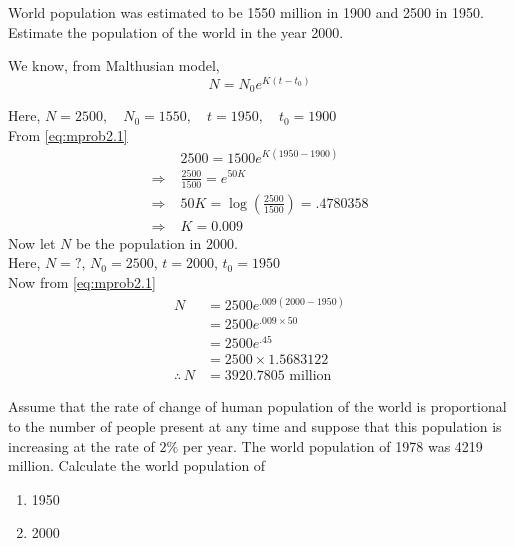 \documentclass[../main-sheet.tex]{subfiles}
\begin{document}
\begin{prob}
    World population was estimated to be 1550 million in 1900 and 2500 in 1950. Estimate the population of the world in the year 2000.
\end{prob}
\begin{soln}
    We know, from Malthusian model,
    \begin{equation}
        N=N_0 e^{K(t-t_0)} \label{eq:mprob2.1}
    \end{equation}
    
    
    Here, \(N=2500,\quad N_0=1550,\quad t=1950,\quad t_0=1900\)\\
    From \eqref{eq:mprob2.1}
    \begin{align*}
        &2500=1500 e^{K(1950-1900)}\\
        \Rightarrow\;&\frac{2500}{1500}= e^{50K}\\
        \Rightarrow\;&50K=\log\left( \frac{2500}{1500} \right)=.4780358\\
        \Rightarrow\;&K=0.009
    \end{align*}
    Now let \(N\) be the population in 2000.\\
    Here, \(N=?\), \(N_0=2500\), \(t=2000\), \(t_0=1950\)\\
    Now from \eqref{eq:mprob2.1}
    \begin{align*}
        N&=2500 e^{.009(2000-1950)}\\
        &=2500 e^{.009\times 50}\\
        &=2500 e^{.45}\\
        &=2500 \times 1.5683122\\
        \therefore\,N&=3920.7805 \text{ million}
    \end{align*}
\end{soln}
\begin{prob}
    Assume that the rate of change of human population of the world is proportional to the number of people present at any time and suppose that this population is increasing at the rate of \(2\%\) per year. The world population of 1978 was 4219 million. Calculate the world population of
    \begin{enumerate}[label=(\alph*)]
        \item 1950
        \item 2000
    \end{enumerate}
\end{prob}
\end{document}
